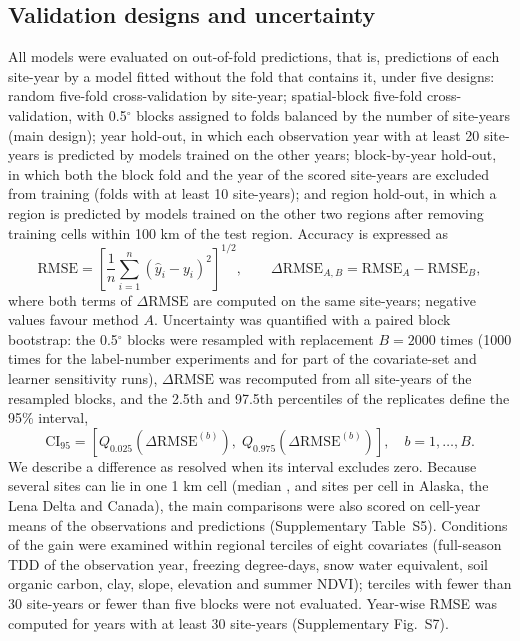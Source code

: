 \subsection{Validation designs and uncertainty}
All models were evaluated on out-of-fold predictions, that is, predictions of each site-year by a model fitted without the fold that contains it, under five designs\cite{Roberts2017,Ploton2020}: random five-fold cross-validation by site-year; spatial-block five-fold cross-validation, with 0.5$^\circ$ blocks assigned to folds balanced by the number of site-years (main design); year hold-out, in which each observation year with at least 20 site-years is predicted by models trained on the other years; block-by-year hold-out, in which both the block fold and the year of the scored site-years are excluded from training (folds with at least 10 site-years); and region hold-out, in which a region is predicted by models trained on the other two regions after removing training cells within 100 km of the test region. Accuracy is expressed as
\begin{equation}
\mathrm{RMSE} = \left[ \frac{1}{n} \sum_{i=1}^{n} \left( \hat{y}_i - y_i \right)^{2} \right]^{1/2}, \qquad \Delta\mathrm{RMSE}_{A,B} = \mathrm{RMSE}_{A} - \mathrm{RMSE}_{B},
\label{eq:rmse}
\end{equation}
where both terms of $\Delta\mathrm{RMSE}$ are computed on the same site-years; negative values favour method $A$. Uncertainty was quantified with a paired block bootstrap\cite{Efron1993,Roberts2017}: the 0.5$^\circ$ blocks were resampled with replacement $B=2000$ times (1000 times for the label-number experiments and for part of the covariate-set and learner sensitivity runs), $\Delta\mathrm{RMSE}$ was recomputed from all site-years of the resampled blocks, and the 2.5th and 97.5th percentiles of the replicates define the 95\% interval,
\begin{equation}
\mathrm{CI}_{95} = \left[ Q_{0.025}\!\left( \Delta\mathrm{RMSE}^{(b)} \right),\; Q_{0.975}\!\left( \Delta\mathrm{RMSE}^{(b)} \right) \right], \quad b = 1,\ldots,B.
\label{eq:ci}
\end{equation}
We describe a difference as resolved when its interval excludes zero. Because several sites can lie in one 1 km cell (median \ncySitesMedAk, \ncySitesMedLe{} and \ncySitesMedCa{} sites per cell in Alaska, the Lena Delta and Canada), the main comparisons were also scored on cell-year means of the observations and predictions (Supplementary Table~S5). Conditions of the gain were examined within regional terciles of eight covariates (full-season TDD of the observation year, freezing degree-days, snow water equivalent, soil organic carbon, clay, slope, elevation and summer NDVI); terciles with fewer than 30 site-years or fewer than five blocks were not evaluated. Year-wise RMSE was computed for years with at least 30 site-years (Supplementary Fig.~S7).

